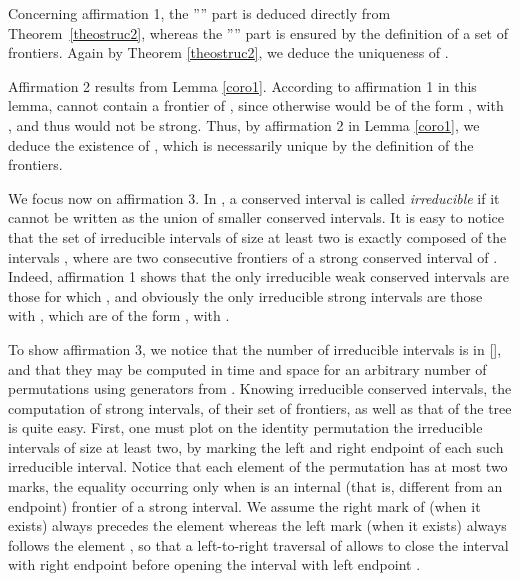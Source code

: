 \documentclass{article}
\begin{document}
\begin{preuve}
Concerning affirmation 1, the '''' part is deduced directly from Theorem~\ref{theostruc2},
whereas the '''' part is ensured by the definition of a set of frontiers.
Again by Theorem \ref{theostruc2}, we deduce the uniqueness of .

Affirmation 2 results from Lemma \ref{coro1}. According to affirmation 1 in this lemma,  cannot contain
a frontier of , since otherwise  would be of the form , with , 
and thus would not be strong. Thus, by affirmation 2 in Lemma \ref{coro1}, we deduce the existence of ,
which is necessarily unique by the definition of the frontiers.

We focus now on affirmation 3. In \citet{BS06}, a conserved interval is called {\it irreducible} if it cannot 
be written as the union
of smaller conserved intervals. It is easy to notice that the set of irreducible intervals of
size at least two is exactly composed of the intervals , where 
 are two consecutive frontiers of a strong conserved interval of .
Indeed, affirmation 1 shows that the only irreducible weak conserved intervals  
are those for which , and obviously the only irreducible strong intervals  are those
with , which are of the form , with . 

To show affirmation 3, we notice that the number of irreducible intervals is in  [\citet{BS06}],
and that they may be computed in  time and space for an arbitrary number  of permutations using 
generators from \citet{IRconserved}.  Knowing irreducible conserved intervals, the computation of
strong intervals, of their set of frontiers, as well as that of the tree is quite easy. First, one
must plot on the identity permutation the  irreducible intervals of size at least two, by marking the left and
right endpoint of each such irreducible interval. Notice that each element  of the permutation 
has at most two marks, the equality occurring only when  is an internal (that is, different from
an endpoint) frontier of a strong interval. We assume the right mark of  (when it exists) 
always precedes the element  whereas the left mark (when it exists) always follows the element , 
so that a left-to-right traversal of  allows to close the interval with right endpoint
 before opening the interval with left endpoint . 


\end{preuve}
\end{document}
